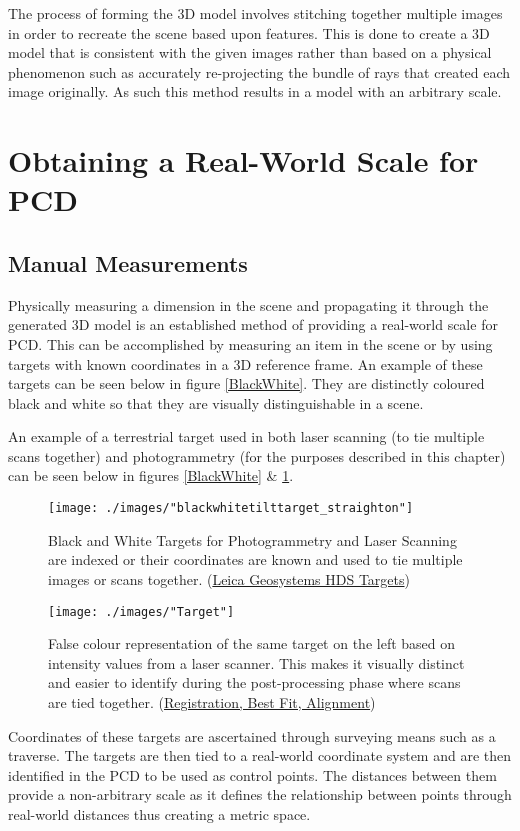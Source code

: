 The process of forming the 3D model involves stitching together multiple images in order to recreate the scene based upon features. This is done to create a 3D model that is consistent with the given images rather than based on a physical phenomenon such as accurately re-projecting the bundle of rays that created each image originally. As such this method results in a model with an arbitrary scale.

\section{Obtaining a Real-World Scale for PCD}
\subsection{Manual Measurements\label{ManualMeasurements}}
Physically measuring a dimension in the scene and propagating it through the generated 3D model is an established method of providing a real-world scale for PCD. This can be accomplished by measuring an item in the scene or by using targets with known coordinates in a 3D reference frame. An example of these targets can be seen below in figure \ref{BlackWhite}. They are distinctly coloured black and white so that they are visually distinguishable in a scene.

An example of a terrestrial target used in both laser scanning (to tie multiple scans together) and photogrammetry (for the purposes described in this chapter) can be seen below in figures \ref{BlackWhite} \& \ref{FalseColour}.
\newline
\begin{figure}[!h]
	\centering
	\begin{minipage}{.45\linewidth}
		\texttt{[image: ./images/"blackwhitetilttarget\_straighton"]}
		\caption[Monochrome targets used in photogrammetry and laser scanning]{Black and White Targets for Photogrammetry and Laser Scanning are indexed or their coordinates are known and used to tie multiple images or scans together. (\href{http://hds.leica-geosystems.com/en/Targets_19143.htm}{Leica Geosystems HDS Targets})}
		\label{BlackWhite}
	\end{minipage}
	\hspace{.05\linewidth}
	\begin{minipage}{.45\linewidth}
		\texttt{[image: ./images/"Target"]}
		\caption[False colour representation of target]{False colour representation of the same target on the left based on intensity values from a laser scanner. This makes it visually distinct and easier to identify during the post-processing phase where scans are tied together. (\href{http://www.3dreshaper.com/en1/En_alignment.htm}{Registration, Best Fit, Alignment})}
		\label{FalseColour}
	\end{minipage}
\end{figure}
\newpage
Coordinates of these targets are ascertained through surveying means such as a traverse. The targets are then tied to a real-world coordinate system and are then identified in the PCD to be used as control points. The distances between them provide a non-arbitrary scale as it defines the relationship between points through real-world distances thus creating a metric space.

